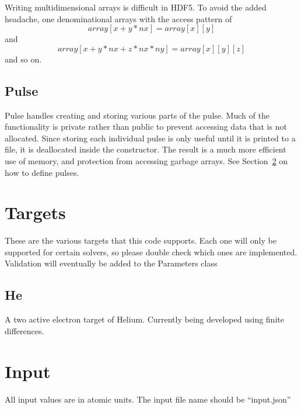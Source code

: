 \documentclass{article}
\begin{document}
Writing multidimensional arrays is difficult in HDF5. To avoid the added headache, one denominational arrays with the access pattern of
\begin{equation}
	array[x+y*nx] = array[x][y]
\end{equation}
and 
\begin{equation}
	array[x+y*nx+z*nx*ny] = array[x][y][z]
\end{equation}
and so on.

\subsection{Pulse} %
\label{sub:pulse}
Pulse handles creating and storing various parts of the pulse. Much of the functionality is private rather than public to prevent accessing data that is not allocated. Since storing each individual pulse is only useful until it is printed to a file, it is deallocated inside the constructor. The result is a much more efficient use of memory, and protection from accessing garbage arrays. See Section~\ref{sec:input} on how to define pulses.


\section{Targets} %
\label{sec:targets}
These are the various targets that this code supports. Each one will only be supported for certain solvers, so please double check which ones are implemented. Validation will eventually be added to the Parameters class
\subsection{He} %
\label{sub:he}
A two active electron target of Helium. Currently being developed using finite differences.

\section{Input} %
\label{sec:input}

All input values are in atomic units. The input file name should be ``input.json''
\end{document}
